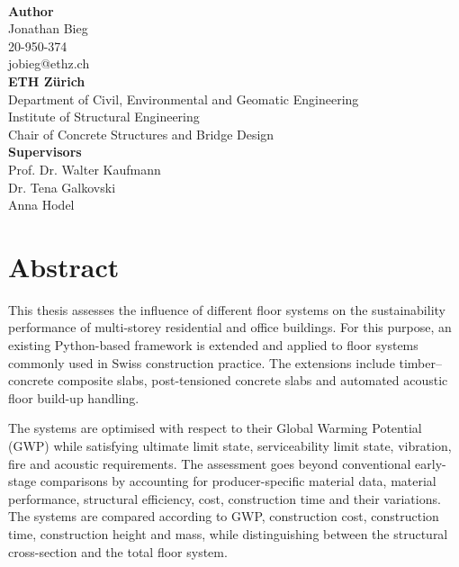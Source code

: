 \begin{titlepage}
{\Large \textbf{}}\\[0.0cm]

{\large \textbf{Author}}\\[0.15cm]
{\large Jonathan Bieg}\\ [0cm]
{\large 20-950-374}\\ [0cm]
{\large jobieg@ethz.ch}\\[0.6cm]


{\large \textbf{ETH Zürich}}\\[0.15cm]
{\large Department of Civil, Environmental and Geomatic Engineering}\\[0cm]
{\large Institute of Structural Engineering}\\[0cm]
{\large Chair of Concrete Structures and Bridge Design}\\[0.6cm]

{\large \textbf{Supervisors}}\\[0cm]
{\large Prof. Dr. Walter Kaufmann}\\[0cm]
{\large Dr. Tena Galkovski}\\[0cm]
{\large Anna Hodel}



\end{titlepage}


\makeatletter \renewcommand*{\chapterheadstartvskip}{\vspace{\dimexpr\@tempskipa-3\baselineskip}}

%
\chapter*{Abstract}
This thesis assesses the influence of different floor systems on the sustainability performance of multi-storey residential and office buildings. For this purpose, an existing Python-based framework is extended and applied to floor systems commonly used in Swiss construction practice. The extensions include timber--concrete composite slabs, post-tensioned concrete slabs and automated acoustic floor build-up handling.

The systems are optimised with respect to their Global Warming Potential (GWP) while satisfying ultimate limit state, serviceability limit state, vibration, fire and acoustic requirements. The assessment goes beyond conventional early-stage comparisons by accounting for producer-specific material data, material performance, structural efficiency, cost, construction time and their variations. The systems are compared according to GWP, construction cost, construction time, construction height and mass, while distinguishing between the structural cross-section and the total floor system.


